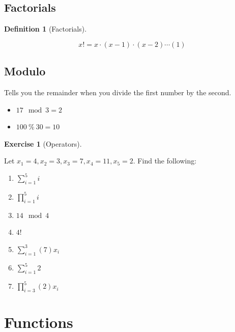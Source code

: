 \documentclass[
  letterpaper,
]{book}
\providecommand{\tightlist}{%
  \setlength{\itemsep}{0pt}\setlength{\parskip}{0pt}}\usepackage{longtable,booktabs,array}
\theoremstyle{definition}
\newtheorem{definition}{Definition}[chapter]
\theoremstyle{definition}
\theoremstyle{plain}
\theoremstyle{definition}
\newtheorem{exercise}{Exercise}[chapter]
\theoremstyle{plain}
\theoremstyle{plain}
\theoremstyle{remark}
\begin{document}
\hypertarget{factorials}{%
\subsection*{Factorials}\label{factorials}}

\leavevmode{}%
\begin{definition}[Factorials]\label{def-summation}

\[
x! = x\cdot (x-1) \cdot (x-2) \cdots (1)
\]

\end{definition}

\hypertarget{modulo}{%
\subsection*{Modulo}\label{modulo}}

Tells you the remainder when you divide the first number by the second.

\begin{itemize}
\tightlist
\item
  \(17 \mod 3 = 2\)
\item
  \(100 \ \% \ 30 = 10\)
\end{itemize}

\leavevmode{}%
\begin{exercise}[Operators]\label{exr-operators}

Let \(x_1 = 4, x_2 = 3, x_3 = 7, x_4 = 11, x_5 = 2\). Find the
following:

\begin{enumerate}
\def\labelenumi{\arabic{enumi}.}
\tightlist
\item
  \(\sum\limits_{i=1}^{5} i\)
\item
  \(\prod\limits_{i=1}^{5} i\)
\item
  \(14 \mod 4\)
\item
  \(4!\)
\item
  \(\sum\limits_{i=1}^{3} (7)x_i\)
\item
  \(\sum\limits_{i=1}^{5} 2\)
\item
  \(\prod\limits_{i=3}^{5} (2)x_i\)
\end{enumerate}

\end{exercise}

\hypertarget{functions}{%
\section*{Functions}\label{functions}}
\end{document}
